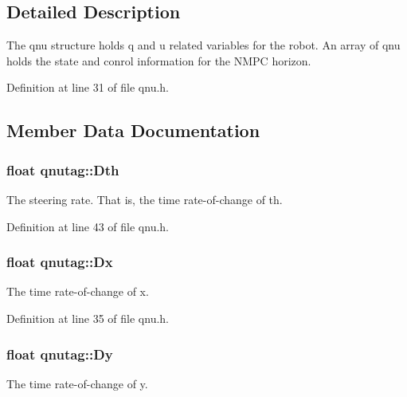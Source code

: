 \subsection{Detailed Description}
The qnu structure holds q and u related variables for the robot. An array of qnu holds the state and conrol information for the N\-M\-P\-C horizon. 

Definition at line 31 of file qnu.\-h.



\subsection{Member Data Documentation}
\hypertarget{structqnutag_ae73c10936a907938a3d0c90e7966b37b}{
\subsubsection[{Dth}]{\setlength{\rightskip}{0pt plus 5cm}float qnutag\-::\-Dth}}\label{structqnutag_ae73c10936a907938a3d0c90e7966b37b}


The steering rate. That is, the time rate-\/of-\/change of th. 



Definition at line 43 of file qnu.\-h.

\hypertarget{structqnutag_aa55459cb3394a42b386db8789f18abb8}{
\subsubsection[{Dx}]{\setlength{\rightskip}{0pt plus 5cm}float qnutag\-::\-Dx}}\label{structqnutag_aa55459cb3394a42b386db8789f18abb8}


The time rate-\/of-\/change of x. 



Definition at line 35 of file qnu.\-h.

\hypertarget{structqnutag_a93e69167497d2354c752ce6327652983}{
\subsubsection[{Dy}]{\setlength{\rightskip}{0pt plus 5cm}float qnutag\-::\-Dy}}\label{structqnutag_a93e69167497d2354c752ce6327652983}


The time rate-\/of-\/change of y. 




